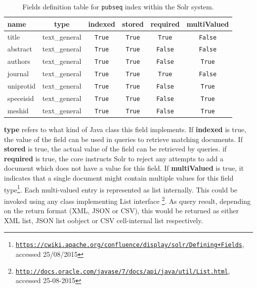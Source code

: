 \begin{table}[htbp]
\caption{Fields definition table for \texttt{pubseq} index within the Solr system.}
\centering
\begin{tabular}{ l  c  c  c  c  c }
  \hline
  name & type & indexed & stored & required & multiValued \\
  \hline
  \hline
  title & text\_general & \texttt{True} & \texttt{True} & \texttt{True} & \texttt{False} \\
  \hline
  abstract & text\_general & \texttt{True} & \texttt{True} & \texttt{False} & \texttt{False} \\
  \hline
  authors & text\_general & \texttt{True} & \texttt{True} & \texttt{False} & \texttt{True} \\
  \hline
  journal & text\_general & \texttt{True} & \texttt{True} & \texttt{True} & \texttt{False} \\
  \hline
  uniprotid & text\_general & \texttt{True} & \texttt{True} & \texttt{False} & \texttt{True} \\
  \hline
  speceisid & text\_general & \texttt{True} & \texttt{True} & \texttt{False} & \texttt{True} \\
  \hline
  meshid & text\_general & \texttt{True} & \texttt{True} & \texttt{False} & \texttt{True} \\
  \hline
\end{tabular}
  \label{fig:FieldsDefSolr}
\end{table}

\textbf{type} refers to what kind of Java class this field implements. If \textbf{indexed} is true, the value of the field can be used in queries to retrieve matching documents. If \textbf{stored} is true, the actual value of the field can be retrieved by queries. if \textbf{required} is true, the core instructs Solr to reject any attempts to add a document which does not have a value for this field. If \textbf{multiValued} is true, it indicates that a single document might contain multiple values for this field type\footnote{\href{https://cwiki.apache.org/confluence/display/solr/Defining+Fields}{\texttt{https://cwiki.apache.org/confluence/display/solr/Defining+Fields}}, accessed 25/08/2015}. Each multi-valued entry is represented as list internally. This could be invoked using any class implementing List interface \footnote{\href{http://docs.oracle.com/javase/7/docs/api/java/util/List.html}{\texttt{http://docs.oracle.com/javase/7/docs/api/java/util/List.html}}, accessed 25-08-2015}. As query result, depending on the return format (XML, JSON or CSV), this would be returned as either XML list, JSON list oobject or CSV cell-internal list respectively.

